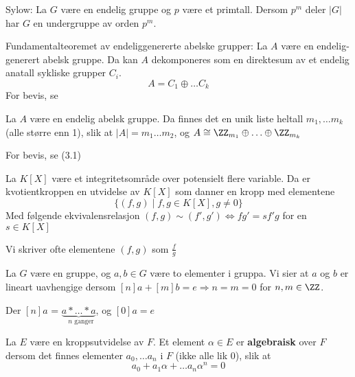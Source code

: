 
\begin{teorem}
Sylow:
La $G$ være en endelig gruppe og $p$ være et primtall. Dersom $p^m$ deler $|G|$ har $G$ en undergruppe av orden $p^m$. \cite{algebra}
\end{teorem}

\begin{teorem}
\label{fundamentalteoremet}
Fundamentalteoremet av endeliggenererte abelske grupper:
La $A$ være en endelig-generert abelsk gruppe. Da kan $A$ dekomponeres som en direktesum av et endelig anatall sykliske grupper $C_i$. 
$$A = C_1 \oplus \ldots C_k $$ 
For bevis, se \cite{algebra}
\end{teorem}

\begin{teorem}
\label{finite abelian group}
La $A$ være en endelig abelsk gruppe. Da finnes det en unik liste heltall $m_1, \ldots m_k$ (alle større enn 1), slik at $|A| = m_1 \ldots m_2$, og $A \cong \ZZ_{m_1} \oplus \ldots \oplus \ZZ_{m_k}$

For bevis, se  \cite{algebra}(3.1)
\end{teorem}


\begin{definisjon}
La $K[X]$ være et integritetsområde over potensielt flere variable. Da er kvotientkroppen en utvidelse av $K[X]$ som danner en kropp med elementene $$ \{(f,g) \mid f,g \in K[X], g \neq 0 \}$$
Med følgende ekvivalensrelasjon
$(f,g) \sim (f',g') \Leftrightarrow fg' = sf'g $ for en $s \in K[X]$

Vi skriver ofte elementene $(f,g)$ som $\frac{f}{g}$
\end{definisjon}

\begin{definisjon}
La $G$ være en gruppe, og $a,b \in G$ være to elementer i gruppa. Vi sier at $a$ og $b$ er lineart uavhengige dersom $[n]a + [m]b = e \Rightarrow n = m = 0$ for $n, m \in \ZZ$. 

Der $[n]a$ = $\underbrace{a * \ldots * a}_\text{ $n$ ganger}$, og $[0]a = e$
\end{definisjon}

\begin{definisjon}
La $E$ være en kroppsutvidelse av $F$. Et element $\alpha \in E$ er \textbf{algebraisk} over $F$ dersom det finnes elementer $a_0, \ldots a_n$ i $F$ (ikke alle lik 0), slik at $$a_0 + a_1\alpha + \ldots a_n \alpha^n = 0$$
\end{definisjon}

